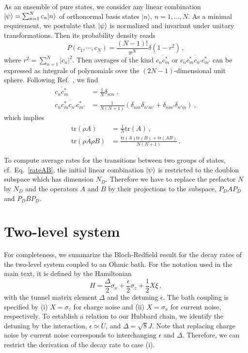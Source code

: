 \documentclass[twocolumn,prb,showpacs]{revtex4-1}
\DeclarePairedDelimiter\ket{\lvert}{\rangle}
\newcommand*{\tr}[1]{\mathrm{tr}\left(#1\right)}
\begin{document}
As an ensemble of pure states, we consider any linear combination
$\ket{\psi}=\sum_{n=1}^N c_n \ket{n}$ of orthonormal basis states
$|n\rangle$, ${n=1,\ldots,N}$.  As a minimal requirement, we postulate that
$\ket{\psi}$ is normalized and invariant under unitary transformations.
Then its probability density reads
\begin{equation}
P(c_1,\cdots,c_N)=\frac{(N-1)!}{\pi^N}\delta\left(1-r^2\right) \,,
\end{equation}
where $r^2=\sum_{n=1}^N |c_n|^2$. Then averages of the 
kind $\overline{c_n c^*_m}$ or $\overline{c_n c^*_m c_{n'} c^*_{m'}}$ can
be expressed as integrals of polynomials over the $(2N-1)$-dimensional 
unit sphere.  Following Ref.~, we find
\begin{align}
 \overline{c_n c^*_m} & =\frac{1}{N}\delta_{nm} \ ,\\
 \overline{c_n c^*_m c_{n'} c^*_{m'}} & = \frac{1}{N(N+1)}(\delta_{nm}\delta_{n'm'}+\delta_{nm'}\delta_{n'm}) \ ,
\end{align}
which implies
\begin{align}
  \overline{\tr{\rho A}} & =\frac{1}{N} \tr{A} \ , \\
  \overline{\tr{\rho A \rho B}} & =\frac{\tr{A}\tr{B}+\tr{AB}}{N(N+1)} \ .
\end{align}

To compute average rates for the transitions between two groups of states,
cf.\ Eq.~\eqref{rateAB}, the initial linear combination $\ket{\psi}$ 
is restricted to the doublon subspace which has dimension $N_D$.  Therefore we
have to replace the prefactor $N$ by $N_D$ and the operators $A$ and $B$ by
their projections to the subspace, $P_DAP_D$ and $P_DBP_D$. 

\section{Two-level system \label{app:TLS}}

For completeness, we summarize the Bloch-Redfield result for the decay
rates of the two-level system coupled to an Ohmic bath.\cite{Weiss1989a,
Makhlin2001b}  For the notation used in the main text, it is defined by the
Hamiltonian
\begin{equation}
  H =\frac{\Delta}{2}\sigma_x+\frac{\epsilon}{2}\sigma_z
     + \frac{1}{2} X \xi \,,
\label{eq:tls}
\end{equation}
with the tunnel matrix element $\Delta$ and the detuning $\epsilon$.  The bath
coupling is specified by (i) $X=\sigma_z$ for charge noise and (ii)
$X=\sigma_x$ for current noise, respectively.
To establish a relation to our Hubbard chain, we identify the detuning by
the interaction, $\epsilon\simeq U$, and $\Delta=\sqrt{8}J$.
Note that replacing charge noise by current noise corresponds to
interchanging $\epsilon$ and $\Delta$.  Therefore, we can restrict the
derivation of the decay rate to case (i).
\end{document}
